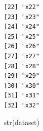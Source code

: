 \documentclass[
  letterpaper,
  DIV=11,
  numbers=noendperiod]{scrreprt}
\newenvironment{Shaded}{\begin{snugshade}}{\end{snugshade}}
\newcommand{\FunctionTok}[1]{\textcolor[rgb]{0.28,0.35,0.67}{#1}}
\newcommand{\NormalTok}[1]{\textcolor[rgb]{0.00,0.23,0.31}{#1}}
\begin{document}
\begin{verbatim}
[22] "x22"                                                                                                                
[23] "x23"                                                                                                                
[24] "x24"                                                                                                                
[25] "x25"                                                                                                                
[26] "x26"                                                                                                                
[27] "x27"                                                                                                                
[28] "x28"                                                                                                                
[29] "x29"                                                                                                                
[30] "x30"                                                                                                                
[31] "x31"                                                                                                                
[32] "x32"                                                                                                                
\end{verbatim}

\begin{Shaded}
\begin{Highlighting}[]
\FunctionTok{str}\NormalTok{(dataset)}
\end{Highlighting}
\end{Shaded}
\end{document}
